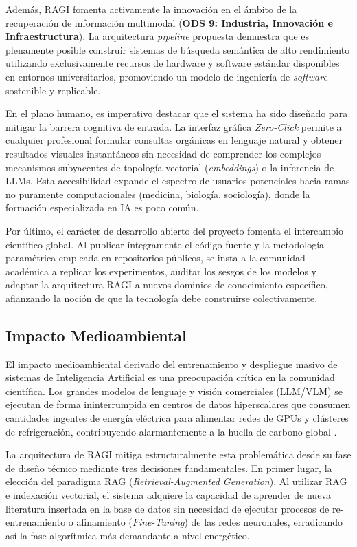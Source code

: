 \documentclass[a4paper]{report}
\begin{document}
Además, RAGI fomenta activamente la innovación en el ámbito de la recuperación de información multimodal (\textbf{ODS 9: Industria, Innovación e Infraestructura}). La arquitectura \textit{pipeline} propuesta demuestra que es plenamente posible construir sistemas de búsqueda semántica de alto rendimiento utilizando exclusivamente recursos de hardware y software estándar disponibles en entornos universitarios, promoviendo un modelo de ingeniería de \textit{software} sostenible y replicable.

En el plano humano, es imperativo destacar que el sistema ha sido diseñado para mitigar la barrera cognitiva de entrada. La interfaz gráfica \textit{Zero-Click} permite a cualquier profesional formular consultas orgánicas en lenguaje natural y obtener resultados visuales instantáneos sin necesidad de comprender los complejos mecanismos subyacentes de topología vectorial (\textit{embeddings}) o la inferencia de LLMs. Esta accesibilidad expande el espectro de usuarios potenciales hacia ramas no puramente computacionales (medicina, biología, sociología), donde la formación especializada en IA es poco común.

Por último, el carácter de desarrollo abierto del proyecto fomenta el intercambio científico global. Al publicar íntegramente el código fuente y la metodología paramétrica empleada en repositorios públicos, se insta a la comunidad académica a replicar los experimentos, auditar los sesgos de los modelos y adaptar la arquitectura RAGI a nuevos dominios de conocimiento específico, afianzando la noción de que la tecnología debe construirse colectivamente.

\subsection{Impacto Medioambiental}

El impacto medioambiental derivado del entrenamiento y despliegue masivo de sistemas de Inteligencia Artificial es una preocupación crítica en la comunidad científica. Los grandes modelos de lenguaje y visión comerciales (LLM/VLM) se ejecutan de forma ininterrumpida en centros de datos hiperscalares que consumen cantidades ingentes de energía eléctrica para alimentar redes de GPUs y clústeres de refrigeración, contribuyendo alarmantemente a la huella de carbono global \cite{touvron2023}.

La arquitectura de RAGI mitiga estructuralmente esta problemática desde su fase de diseño técnico mediante tres decisiones fundamentales. En primer lugar, la elección del paradigma RAG (\textit{Retrieval-Augmented Generation}). Al utilizar RAG e indexación vectorial, el sistema adquiere la capacidad de aprender de nueva literatura insertada en la base de datos sin necesidad de ejecutar procesos de re-entrenamiento o afinamiento (\textit{Fine-Tuning}) de las redes neuronales, erradicando así la fase algorítmica más demandante a nivel energético. 
\end{document}
